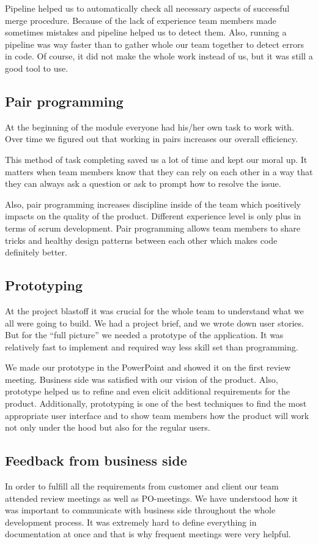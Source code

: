 Pipeline helped us to automatically check all necessary aspects of successful merge procedure. Because of the lack of experience team members made sometimes mistakes and pipeline helped us to detect them. Also, running a pipeline was way faster than to gather whole our team together to detect errors in code.  Of course, it did not make the whole work instead of us, but it was still a good tool to use.  

\subsection{Pair programming}
At the beginning of the module everyone had his/her own task to work with. Over time we figured out that working in pairs increases our overall efficiency. 

This method of task completing saved us a lot of time and kept our moral up. It matters when team members know that they can rely on each other in a way that they can always ask a question or ask to prompt how to resolve the issue. 

Also, pair programming increases discipline inside of the team which positively impacts on the quality of the product.  Different experience level is only plus in terms of scrum development. Pair programming allows team members to share tricks and healthy design patterns between each other which makes code definitely better.

\subsection{Prototyping}
At the project blastoff it was crucial for the whole team to understand what we all were going to build. We had a project brief, and we wrote down user stories. But for the “full picture” we needed a prototype of the application. It was relatively fast to implement and required way less skill set than programming. 

We made our prototype in the PowerPoint and showed it on the first review meeting. Business side was satisfied with our vision of the product. Also, prototype helped us to refine and even elicit additional requirements for the product. Additionally, prototyping is one of the best techniques to find the most appropriate user interface and to show team members how the product will work not only under the hood but also for the regular users.

\subsection{Feedback from business side}
In order to fulfill all the requirements from customer and client our team attended review meetings as well as PO-meetings. We have understood how it was important to communicate with business side throughout the whole development process. It was extremely hard to define everything in documentation at once and that is why frequent meetings were very helpful.

